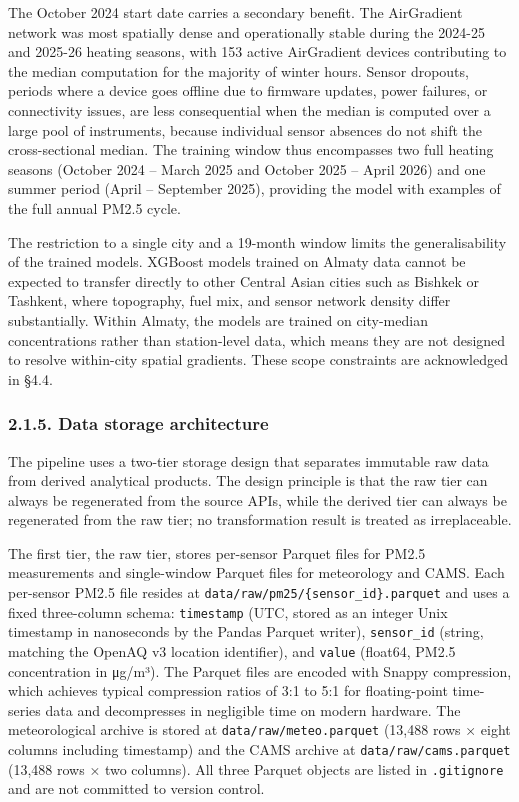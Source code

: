 The October 2024 start date carries a secondary benefit. The AirGradient network was most spatially dense and operationally stable during the 2024-25 and 2025-26 heating seasons, with 153 active AirGradient devices contributing to the median computation for the majority of winter hours. Sensor dropouts, periods where a device goes offline due to firmware updates, power failures, or connectivity issues, are less consequential when the median is computed over a large pool of instruments, because individual sensor absences do not shift the cross-sectional median. The training window thus encompasses two full heating seasons (October 2024 -- March 2025 and October 2025 -- April 2026) and one summer period (April -- September 2025), providing the model with examples of the full annual PM2.5 cycle.

The restriction to a single city and a 19-month window limits the generalisability of the trained models. XGBoost models trained on Almaty data cannot be expected to transfer directly to other Central Asian cities such as Bishkek or Tashkent, where topography, fuel mix, and sensor network density differ substantially. Within Almaty, the models are trained on city-median concentrations rather than station-level data, which means they are not designed to resolve within-city spatial gradients. These scope constraints are acknowledged in §4.4.

\subsubsection{2.1.5. Data storage architecture}\label{data-storage-architecture}

The pipeline uses a two-tier storage design that separates immutable raw data from derived analytical products. The design principle is that the raw tier can always be regenerated from the source APIs, while the derived tier can always be regenerated from the raw tier; no transformation result is treated as irreplaceable.

The first tier, the raw tier, stores per-sensor Parquet files for PM2.5 measurements and single-window Parquet files for meteorology and CAMS. Each per-sensor PM2.5 file resides at \texttt{data/raw/pm25/\{sensor\_id\}.parquet} and uses a fixed three-column schema: \texttt{timestamp} (UTC, stored as an integer Unix timestamp in nanoseconds by the Pandas Parquet writer), \texttt{sensor\_id} (string, matching the OpenAQ v3 location identifier), and \texttt{value} (float64, PM2.5 concentration in μg/m³). The Parquet files are encoded with Snappy compression, which achieves typical compression ratios of 3:1 to 5:1 for floating-point time-series data and decompresses in negligible time on modern hardware. The meteorological archive is stored at \texttt{data/raw/meteo.parquet} (13,488 rows × eight columns including timestamp) and the CAMS archive at \texttt{data/raw/cams.parquet} (13,488 rows × two columns). All three Parquet objects are listed in \texttt{.gitignore} and are not committed to version control.

